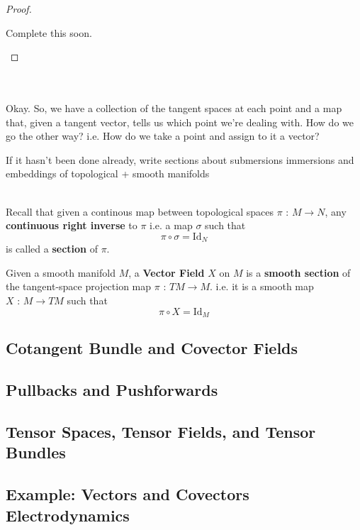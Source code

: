 \documentclass[11pt]{article}
\begin{document}
\begin{proof}
  \begin{note}
    {Complete this soon.}
  \end{note}
\end{proof}
\\
\\
Okay. So, we have a collection of the tangent spaces at each point and a map that, given a tangent vector, tells us which point we're dealing with. How do we go the other way? i.e. How do we take a point and assign to it a vector? 
\\
\begin{dottedbox}
  \begin{note}
    {If it hasn't been done already, write sections about submersions immersions and embeddings of topological + smooth manifolds}
  \end{note}
  \\
  Recall that given a continous map between topological spaces $\pi \text{ : } M \rightarrow N$, any \textbf{continuous right inverse} to $\pi$ i.e. a map $\sigma$ such that 
  \[ \pi \circ \sigma = \mathrm{Id}_{N} \]
  is called a \textbf{section} of $\pi$.
\end{dottedbox}

\begin{redbox}
  Given a smooth manifold $M$, a \textbf{Vector Field} $X$ on $M$ is a \textbf{smooth section} of the tangent-space projection map $\pi \text{ : } TM \rightarrow M$. i.e. it is a smooth map $X \text{ : } M \rightarrow TM$ such that 
  \[ \pi \circ X = \mathrm{Id}_{M} \]  
\end{redbox}

\subsection{Cotangent Bundle and Covector Fields}

\subsection{Pullbacks and Pushforwards}

\subsection{Tensor Spaces, Tensor Fields, and Tensor Bundles}

\subsection{Example: Vectors and Covectors Electrodynamics}
\end{document}
